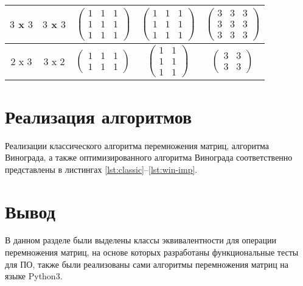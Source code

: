 \begin{table}[h!]
\begin{center}
\begin{tabular}{|c|c|c|c|c|}
            \hline
            $3$ x $3$ &
            $3$ x $3$ &
			$\begin{pmatrix}
			1 & 1 & 1\\
			1 & 1 & 1\\
			1 & 1 & 1
			\end{pmatrix}$ &
			$\begin{pmatrix}
			1 & 1 & 1\\
			1 & 1 & 1\\
			1 & 1 & 1
			\end{pmatrix}$ &
			$\begin{pmatrix}
            3 & 3 & 3\\
            3 & 3 & 3\\
            3 & 3 & 3
			\end{pmatrix}$\\
            \hline
	        $2$ x $3$ &
            $3$ x $2$ &
			$\begin{pmatrix}
			1 & 1 & 1\\
			1 & 1 & 1
			\end{pmatrix}$ &
			$\begin{pmatrix}
			1 & 1 \\
			1 & 1 \\
			1 & 1 
			\end{pmatrix}$ &
			$\begin{pmatrix}
            3 & 3\\
            3 & 3
            \end{pmatrix}$\\
            \hline
        \end{tabular}
        \label{tab:tests}
	\end{center}
\end{table}

\section{Реализация алгоритмов}

Реализации классического алгоритма перемножения матриц, алгоритма Винограда, а также оптимизированного 
алгоритма Винограда соответственно представлены в листингах \ref{lst:classic}--\ref{lst:win-imp}.



\section{Вывод}
В данном разделе были выделены классы эквивалентности для операции перемножения матриц, 
на основе которых разработаны функциональные тесты для ПО, также были реализованы сами алгоритмы 
перемножения матриц на языке Python3.